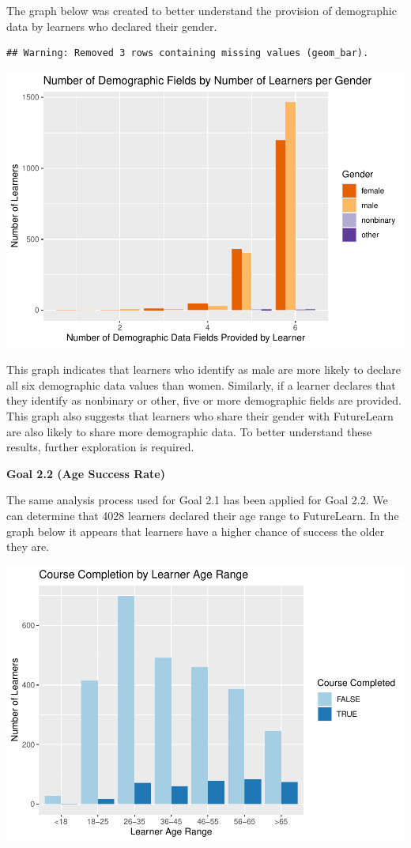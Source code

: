 \documentclass[
]{article}
\begin{document}
The graph below was created to better understand the provision of
demographic data by learners who declared their gender.

\begin{verbatim}
## Warning: Removed 3 rows containing missing values (geom_bar).
\end{verbatim}

\includegraphics{CSC8631-Report---210431461_files/figure-latex/gender_demographic_declared-1.pdf}

This graph indicates that learners who identify as male are more likely
to declare all six demographic data values than women. Similarly, if a
learner declares that they identify as nonbinary or other, five or more
demographic fields are provided. This graph also suggests that learners
who share their gender with FutureLearn are also likely to share more
demographic data. To better understand these results, further
exploration is required.

\textbf{Goal 2.2 (Age Success Rate)}

The same analysis process used for Goal 2.1 has been applied for Goal
2.2. We can determine that 4028 learners declared their age range to
FutureLearn. In the graph below it appears that learners have a higher
chance of success the older they are.

\includegraphics{CSC8631-Report---210431461_files/figure-latex/age_completion-1.pdf}
\end{document}
